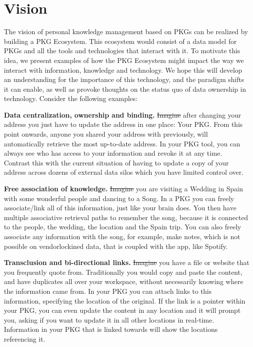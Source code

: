 \section{Vision}
The vision of personal knowledge management based on PKGs can be realized by building a PKG Ecosystem. This ecosystem would consist of a data model for PKGs and all the tools and technologies that interact with it. To motivate this idea, we present examples of how the PKG Ecosystem might impact the way we interact with information, knowledge and technology. We hope this will develop an understanding for the importance of this technology, and the paradigm shifts it can enable, as well as provoke thoughts on the status quo of data ownership in technology. Consider the following examples:

\textbf{Data centralization, ownership and binding.} \sout{Imagine} after changing your address you just have to update the address in one place: Your PKG. From this point onwards, anyone you shared your address with previously, will automatically retrieve the most up-to-date address. In your PKG tool, you can always see who has access to your information and revoke it at any time. Contrast this with the current situation of having to update a copy of your address across dozens of external data silos which you have limited control over.

\textbf{Free association of knowledge.} \sout{Imagine} you are visiting a Wedding in Spain with some wonderful people and dancing to a Song. In a PKG you can freely associate/link all of this information, just like your brain does. You then have multiple associative retrieval paths to remember the song, because it is connected to the people, the wedding, the location and the Spain trip. You can also freely associate any information with the song, for example, make notes, which is not possible on \gls{vendorlockin}ed data, that is coupled with the app, like Spotify.

\textbf{Transclusion and bi-directional links.} \sout{Imagine} you have a file or website that you frequently quote from. Traditionally you would copy and paste the content, and have duplicates all over your workspace, without necessarily knowing where the information came from. In your PKG you can attach links to this information, specifying the location of the original. If the link is a pointer within your PKG, you can even update the content in any location and it will prompt you, asking if you want to update it in all other locations in real-time. Information in your PKG that is linked towards will show the locations referencing it.

